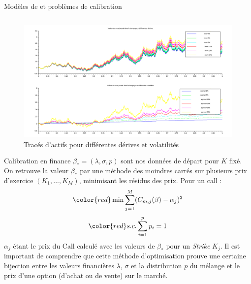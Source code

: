 \documentclass[final]{beamer}
\newlength{\onecolwid}
\newlength{\twocolwid}
\begin{document}
\begin{frame}[t]
\begin{columns}[t]
\begin{column}{\twocolwid}
\begin{block}{Modèles de  et problèmes de calibration}
\begin{columns}[t,totalwidth=\twocolwid]
\begin{column}{\onecolwid}
\begin{figure}[!H]
  \centerline{\includegraphics[scale=0.65]{bs_actif_mopsi.png}}
  \label{actifs}
  \caption{Tracés d'actifs pour différentes dérives et volatilités}

\end{figure}

\vspace{0.3cm}
\begin{alertblock}{Calibration en finance}
  $ \beta_* = (\lambda,\sigma,p)$ sont nos données de départ pour $K$ fixé.
  \newline
  On retrouve la valeur $\beta_*$ par une méthode des moindres carrés sur plusieurs prix d'exercice $(K_1,...,K_M)$, minimisant les résidus des prix. \newline
  Pour un call :
  \[{\color{red} \min \sum^M_{j=1} (C_{m,j}(\beta)-\alpha_j)^2} \]
  \vspace{-0.4cm}
  \[  {\color{red} s.c. \sum^p_{i=1}p_i = 1} \]
$\alpha_j$ étant le prix du Call calculé avec les valeurs de $\beta_*$ pour un \textit{Strike} $K_j$.
\newline
Il est important de comprendre que cette méthode d'optimisation prouve une certaine bijection entre les valeurs financières $\lambda$, $\sigma$ et la distribution $p$ du mélange et le prix d'une option (d'achat ou de vente) sur le marché.
\end{alertblock}
\end{column} %

\end{columns} %


\end{block}
\end{column}
\end{columns}
\end{frame}
\end{document}
